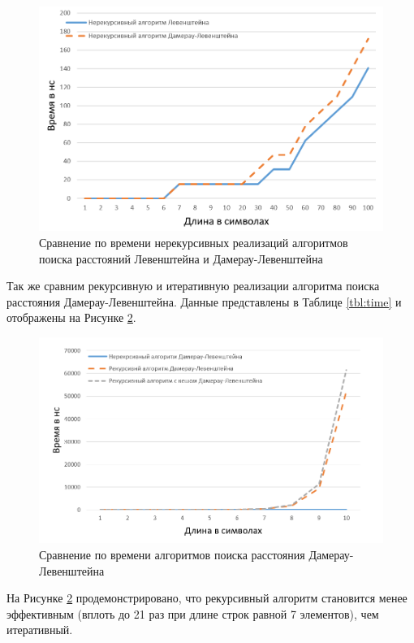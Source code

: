 \begin{figure}[h]
	\centering
	\includegraphics[height=0.3\textheight]{img/diag_01.png}
	\caption{Сравнение по времени нерекурсивных реализаций алгоритмов поиска расстояний Левенштейна и Дамерау-Левенштейна}
	\label{plt:time_01}
\end{figure}

Так же сравним рекурсивную и итеративную реализации алгоритма поиска расстояния Дамерау-Левенштейна. Данные представлены в Таблице \ref{tbl:time} и отображены на Рисунке \ref{plt:time_02}.

\begin{figure}[h]
	\centering
	\includegraphics[height=0.3\textheight]{img/diag_02.png}
	\caption{Сравнение по времени алгоритмов поиска расстояния Дамерау-Левенштейна}
	\label{plt:time_02}
\end{figure}

На Рисунке \ref{plt:time_02} продемонстрировано, что рекурсивный алгоритм становится менее эффективным (вплоть до 21 раз при длине строк равной 7 элементов), чем итеративный.

